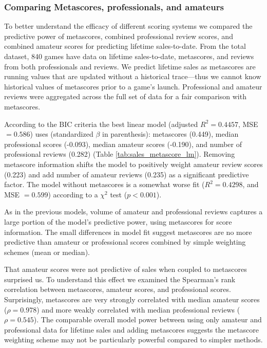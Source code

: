 \documentclass{sig-alternate}
\begin{document}
\subsubsection{Comparing Metascores, professionals, and amateurs}
To better understand the efficacy of different scoring systems we compared the predictive power of metascores, combined professional review scores, and combined amateur scores for predicting lifetime sales-to-date. From the total dataset, 840 games have data on lifetime sales-to-date, metascores, and reviews from both professionals and reviews. We predict lifetime sales as metascores are running values that are updated without a historical trace---thus we cannot know historical values of metascores prior to a game's launch. Professional and amateur reviews were aggregated across the full set of data for a fair comparison with metascores.

According to the BIC criteria the best linear model (adjusted $R^2 = 0.4457$, MSE $= 0.586$) uses (standardized $\beta$ in parenthesis): metascores (0.449), median professional scores (-0.093), median amateur scores (-0.190), and number of professional reviews (0.282) (Table \ref{tab:sales_metascore_lm}). Removing metascore information shifts the model to positively weight amateur review scores (0.223) and add number of amateur reviews (0.235) as a significant predictive factor. The model without metascores is a somewhat worse fit ($R^2 = 0.4298$, and MSE $= 0.599$) according to a $\chi^2$ test ($p < 0.001$).

As in the previous models, volume of amateur and professional reviews captures a large portion of the model's predictive power, using metascores for score information. The small differences in model fit suggest metascores are no more predictive than amateur or professional scores combined by simple weighting schemes (mean or median). 

That amateur scores were not predictive of sales when coupled to metascores surprised us. To understand this effect we examined the Spearman's rank correlation between metascores, amateur scores, and professional scores. Surprisingly, metascores are very strongly correlated with median amateur scores ($\rho = 0.978$) and more weakly correlated with median professional reviews ($\rho = 0.545$). The comparable overall model power between using only amateur and professional data for lifetime sales and adding metascores suggests the metascore weighting scheme may not be particularly powerful compared to simpler methods.
\end{document}
